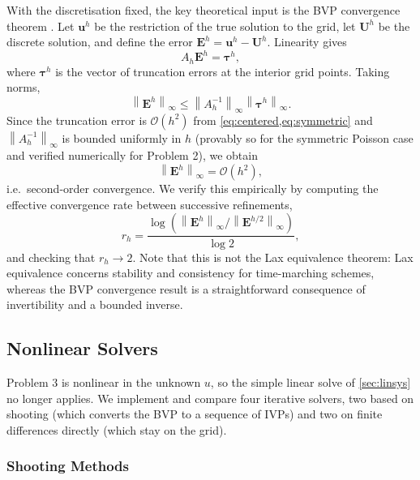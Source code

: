 \documentclass[11pt]{article}
\theoremstyle{plain}
\theoremstyle{remark}
\newcommand{\norm}[1]{\left\| #1 \right\|}
\newcommand{\Ah}{A_h}
\newcommand{\bigO}{\mathcal{O}}
\begin{document}
With the discretisation fixed, the key theoretical input is the BVP
convergence theorem \citep{khouider2026bvp}. Let $\mathbf{u}^h$ be
the restriction of the true solution to the grid, let $\mathbf{U}^h$ be the
discrete solution, and define the error $\mathbf{E}^h = \mathbf{u}^h - \mathbf{U}^h$.
Linearity gives
\begin{equation}
\Ah \mathbf{E}^h = \boldsymbol{\tau}^h,
\label{eq:errlin}
\end{equation}
where $\boldsymbol{\tau}^h$ is the vector of truncation errors at the
interior grid points. Taking norms,
\begin{equation}
\norm{\mathbf{E}^h}_\infty \le \norm{\Ah^{-1}}_\infty \norm{\boldsymbol{\tau}^h}_\infty.
\end{equation}
Since the truncation error is $\bigO(h^2)$ from
\cref{eq:centered,eq:symmetric} and $\norm{\Ah^{-1}}_\infty$ is bounded
uniformly in $h$ (provably so for the symmetric Poisson case and
verified numerically for Problem 2), we obtain
\begin{equation}
\norm{\mathbf{E}^h}_\infty = \bigO(h^2),
\end{equation}
i.e.\ second-order convergence. We verify this empirically by computing
the effective convergence rate between successive refinements,
\begin{equation}
r_h = \frac{\log\left(\norm{\mathbf{E}^h}_\infty \big/ \norm{\mathbf{E}^{h/2}}_\infty\right)}{\log 2},
\label{eq:rate}
\end{equation}
and checking that $r_h \to 2$. Note that this is not the Lax equivalence
theorem: Lax equivalence concerns stability and consistency for
time-marching schemes, whereas the BVP convergence result is a
straightforward consequence of invertibility and a bounded inverse.


\subsection{Nonlinear Solvers}
\label{sec:nonlinear}

Problem 3 is nonlinear in the unknown $u$, so the simple linear solve of
\cref{sec:linsys} no longer applies. We implement and compare four
iterative solvers, two based on shooting (which converts the BVP to a
sequence of IVPs) and two on finite differences directly (which stay on
the grid).


\subsubsection{Shooting Methods}
\label{sec:shooting}
\end{document}
